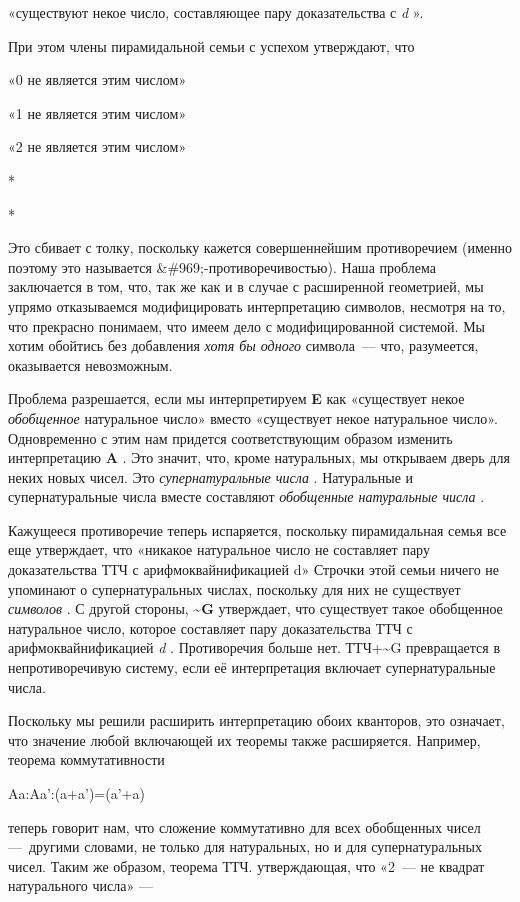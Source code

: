 \documentclass[../main.tex]{subfiles}
\begin{document}
«существуют некое число, составляющее пару доказательства с \emph{d} ».

При этом члены пирамидальной семьи с успехом утверждают, что

«0 не является этим числом»

«1 не является этим числом»

«2 не является этим числом»

*

*

Это сбивает с толку, поскольку кажется совершеннейшим противоречием (именно поэтому это называется \&\#969;-противоречивостью). Наша проблема заключается в том, что, так же как и в случае с расширенной геометрией, мы упрямо отказываемся модифицировать интерпретацию символов, несмотря на то, что прекрасно понимаем, что имеем дело с модифицированной системой. Мы хотим обойтись без добавления \emph{хотя бы одного} символа~--- что, разумеется, оказывается невозможным.

Проблема разрешается, если мы интерпретируем \textbf{E} как «существует некое \emph{обобщенное} натуральное число» вместо «существует некое натуральное число». Одновременно с этим нам придется соответствующим образом изменить интерпретацию \textbf{A} . Это значит, что, кроме натуральных, мы открываем дверь для неких новых чисел. Это \emph{супернатуральные числа} . Натуральные и супернатуральные числа вместе составляют \emph{обобщенные натуральные числа} .

Кажущееся противоречие теперь испаряется, поскольку пирамидальная семья все еще утверждает, что «никакое натуральное число не составляет пару доказательства ТТЧ с арифмоквайнификацией d» Строчки этой семьи ничего не упоминают о супернатуральных числах, поскольку для них не существует \emph{символов} . С другой стороны, \textbf{\textasciitilde G} утверждает, что существует такое обобщенное натуральное число, которое составляет пару доказательства ТТЧ с арифмоквайнификацией \emph{d} . Противоречия больше нет. ТТЧ+\textasciitilde G превращается в непротиворечивую систему, если её интерпретация включает супернатуральные числа.

Поскольку мы решили расширить интерпретацию обоих кванторов, это означает, что значение любой включающей их теоремы также расширяется. Например, теорема коммутативности

Aa:Aa':(a+a')=(a'+a)

теперь говорит нам, что сложение коммутативно для всех обобщенных чисел ---~другими словами, не только для натуральных, но и для супернатуральных чисел. Таким же образом, теорема ТТЧ. утверждающая, что «2~--- не квадрат натурального числа» ---
\end{document}
